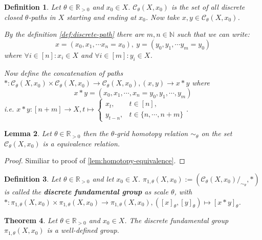 \documentclass[a4paper, 11pt, twoside]{article}
\newcommand{\R}[0]{\mathbb{R}}
\newcommand{\N}[0]{\mathbb{N}}
\theoremstyle{break}
\newtheorem{thm}{Theorem}[section]
\theoremstyle{break}
\newtheorem{defin}[thm]{Definition}
\newtheorem{lemma}[thm]{Lemma}
\begin{document}
\begin{defin}
  Let $\theta \in \R_{>0}$ and $x_0 \in X$. $\mathcal{C}_{\theta}(X, x_0)$ is the set of all discrete closed $\theta$-paths in $X$ starting and ending at $x_0$. Now take $x, y \in \mathcal{C}_{\theta}(X, x_0)$.
  
  By the definition \ref{def:discrete-path} there are $m,n \in \N$ such that we can write: 
  \begin{equation*}
    x = (x_0, x_1, \cdots x_n = x_0), \: y = (y_0, y_1, \cdots y_m = y_0)
  \end{equation*} where $\forall i \in [n]: x_i \in X$ and $\forall i \in [m]: y_i \in X$.

  Now define the concatenation of paths $*: \mathcal{C}_{\theta}(X, x_0) \times \mathcal{C}_{\theta}(X, x_0) \to \mathcal{C}_{\theta}(X, x_0), (x, y) \to x * y$ where
  \begin{equation*}
    x * y = (x_0, x_1, \cdots, x_n = y_0, y_1, \cdots, y_m)
  \end{equation*}
  i.e. $x * y: [n+m] \to X, t \mapsto \begin{cases}
    x_t, &t \in [n], \\
    y_{t-n}, &t \in \{n, \cdots, n+m\}
  \end{cases}$.
\end{defin}

\begin{lemma} \label{lem:discrete-homotopy}
  Let $\theta \in \R_{>0}$ then the $\theta$-grid homotopy relation $\sim_{\theta}$ on the set $\mathcal{C}_{\theta}(X, x_0)$ is a equivalence relation.
\end{lemma}

\begin{proof}
  Similiar to proof of \ref{lem:homotopy-equivalence}.
\end{proof}

\begin{defin}
  Let $\theta \in \R_{>0}$ and let $x_0 \in X$. $\pi_{1,\theta}(X, x_0) := (\mathcal{C}_{\theta}(X, x_0)/_{\sim_{\theta}}, *)$ is called the \textbf{discrete fundamental group} as scale $\theta$,
  with $*: \pi_{1,\theta}(X, x_0) \times \pi_{1,\theta}(X, x_0) \to \pi_{1,\theta}(X, x_0), ([x]_{\theta}, [y]_{\theta}) \mapsto [x * y]_{\theta}$.
\end{defin}

\begin{thm}
  Let $\theta \in \R_{>0}$ and $x_0 \in X$. The discrete fundamental group $\pi_{1,\theta}(X, x_0)$ is a well-defined group.
\end{thm}
\end{document}
